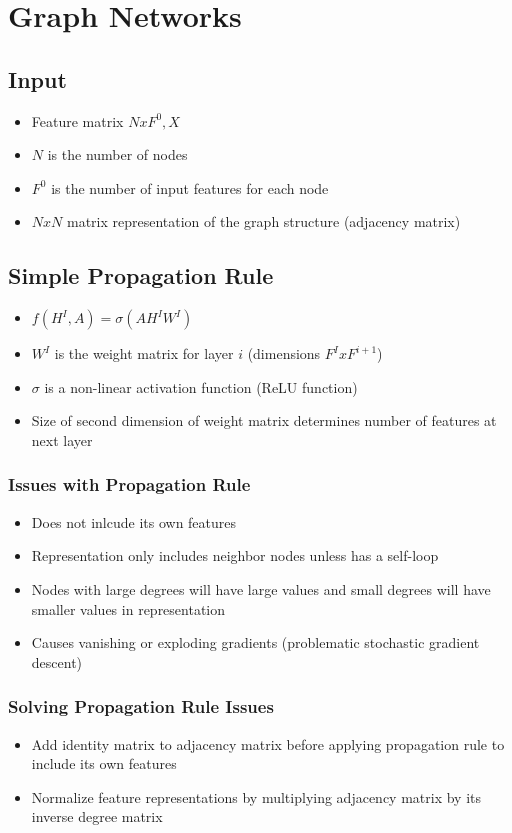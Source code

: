 \section{Graph Networks}
\subsection{Input}
\begin{itemize}
	\item Feature matrix $N x F^{0}, X$
	\item $N$ is the number of nodes
	\item $F^{0}$ is the number of input features for each node
	\item $N x N$ matrix representation of the graph structure (adjacency matrix)
\end{itemize}
\subsection{Simple Propagation Rule}
\begin{itemize}
	\item $f(H^{I}, A) = \sigma(AH^{I}W^{I})$
	\item $W^{I}$ is the weight matrix for layer $i$ (dimensions $F^{I} x F^{i+1}$)
	\item $\sigma$ is a non-linear activation function (ReLU function)
	\item Size of second dimension of weight matrix determines number of features at next layer
\end{itemize}
\subsubsection{Issues with Propagation Rule}
\begin{itemize}
	\item Does not inlcude its own features
	\item Representation only includes neighbor nodes unless has a self-loop
	\item Nodes with large degrees will have large values and small degrees will have smaller values in representation
	\item Causes vanishing or exploding gradients (problematic stochastic gradient descent)
\end{itemize}
\subsubsection{Solving Propagation Rule Issues}
\begin{itemize}
	\item Add identity matrix to adjacency matrix before applying propagation rule to include its own features
	\item Normalize feature representations by multiplying adjacency matrix by its inverse degree matrix
\end{itemize}
